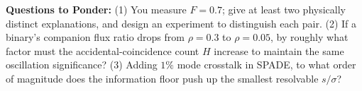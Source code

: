 \medskip
\noindent\textbf{Questions to Ponder:} (1) You measure \(F=0.7\); give at least two physically distinct explanations, and design an experiment to distinguish each pair. (2) If a binary's companion flux ratio drops from \(\rho=0.3\) to \(\rho=0.05\), by roughly what factor must the accidental-coincidence count \(H\) increase to maintain the same oscillation significance? (3) Adding \(1\%\) mode crosstalk in SPADE, to what order of magnitude does the information floor push up the smallest resolvable \(s/\sigma\)?
